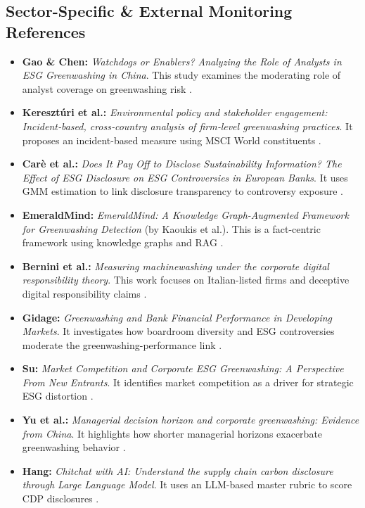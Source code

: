 \documentclass{article}
\begin{document}
\subsection*{Sector-Specific \& External Monitoring References}
\begin{itemize}
\item 

\textbf{Gao \& Chen:} \textit{Watchdogs or Enablers? Analyzing the Role of Analysts in ESG Greenwashing in China}. This study examines the moderating role of analyst coverage on greenwashing risk  \parencite{yingxue_gao_8b3fd5d6}.\item 

\textbf{Keresztúri et al.:} \textit{Environmental policy and stakeholder engagement: Incident‐based, cross‐country analysis of firm‐level greenwashing practices}. It proposes an incident-based measure using MSCI World constituents  \parencite{judit_lilla_kereszt_ri_2b69ff6c}.\item 

\textbf{Carè et al.:} \textit{Does It Pay Off to Disclose Sustainability Information? The Effect of ESG Disclosure on ESG Controversies in European Banks}. It uses GMM estimation to link disclosure transparency to controversy exposure  \parencite{rosella_car__329ad403}.\item 

\textbf{EmeraldMind:} \textit{EmeraldMind: A Knowledge Graph-Augmented Framework for Greenwashing Detection} (by Kaoukis et al.). This is a fact-centric framework using knowledge graphs and RAG  \parencite[]{kaoukis__georgios_b41fd289, kaoukis__georgios_35bab107}.\item 

\textbf{Bernini et al.:} \textit{Measuring machinewashing under the corporate digital responsibility theory}. This work focuses on Italian-listed firms and deceptive digital responsibility claims  \parencite{francesca_bernini_a08757fb}.\item 

\textbf{Gidage:} \textit{Greenwashing and Bank Financial Performance in Developing Markets}. It investigates how boardroom diversity and ESG controversies moderate the greenwashing-performance link  \parencite{mithilesh_gidage_c7d9642e}.\item 

\textbf{Su:} \textit{Market Competition and Corporate ESG Greenwashing: A Perspective From New Entrants}. It identifies market competition as a driver for strategic ESG distortion  \parencite{yaya_su_64f82abe}.\item 

\textbf{Yu et al.:} \textit{Managerial decision horizon and corporate greenwashing: Evidence from China}. It highlights how shorter managerial horizons exacerbate greenwashing behavior  \parencite{jinyue_yu_bc7fed1e}.\item 

\textbf{Hang:} \textit{Chitchat with AI: Understand the supply chain carbon disclosure through Large Language Model}. It uses an LLM-based master rubric to score CDP disclosures  \parencite{haotian_hang_7bf4fb2d}.
\end{itemize}
\end{document}
